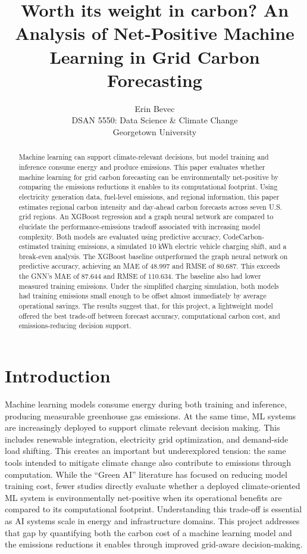 \documentclass{article}
\title{Worth its weight in carbon? An Analysis of Net-Positive Machine Learning in Grid Carbon Forecasting}
\author{%
  Erin Bevec \\
  DSAN 5550: Data Science \& Climate Change\\
  Georgetown University\\
}
\begin{document}
\maketitle

\begin{abstract}
  Machine learning can support climate-relevant decisions, but model training and inference consume energy and produce emissions. This paper evaluates whether machine learning for grid carbon forecasting can be environmentally net-positive by comparing the emissions reductions it enables to its computational footprint. Using electricity generation data, fuel-level emissions, and regional information, this paper estimates regional carbon intensity and day-ahead carbon forecasts across seven U.S. grid regions. An XGBoost regression and a graph neural network are compared to elucidate the performance-emissions tradeoff associated with increasing model complexity. Both models are evaluated using predictive accuracy, CodeCarbon-estimated training emissions, a simulated 10 kWh electric vehicle charging shift, and a break-even analysis. The XGBoost baseline outperformed the graph neural network on predictive accuracy, achieving an MAE of 48.997 and RMSE of 80.687. This exceeds the GNN's MAE of 87.644 and RMSE of 110.634. The baseline also had lower measured training emissions. Under the simplified charging simulation, both models had training emissions small enough to be offset almost immediately by average operational savings. The results suggest that, for this project, a lightweight model offered the best trade-off between forecast accuracy, computational carbon cost, and emissions-reducing decision support.
\end{abstract}

\section{Introduction}

Machine learning models consume energy during both training and inference, producing measurable greenhouse gas emissions. At the same time, ML systems are increasingly deployed to support climate relevant decision making. This includes renewable integration, electricity grid optimization, and demand-side load shifting. This creates an important but underexplored tension: the same tools intended to mitigate climate change also contribute to emissions through computation. While the ``Green AI'' literature has focused on reducing model training cost, fewer studies directly evaluate whether a deployed climate-oriented ML system is environmentally net-positive when its operational benefits are compared to its computational footprint. Understanding this trade-off is essential as AI systems scale in energy and infrastructure domains. This project addresses that gap by quantifying both the carbon cost of a machine learning model and the emissions reductions it enables through improved grid-aware decision-making.
\end{document}
